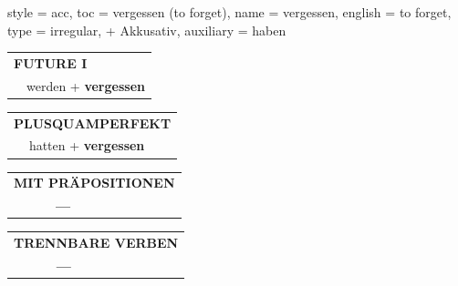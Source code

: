 \begin{verbentry}{
  style = {acc},
  toc = {vergessen (to forget)},
  name = {vergessen},
  english = {to forget},
  type = {irregular, + Akkusativ},
  auxiliary = {haben}
}
\begin{tabular}{rl}
    \multicolumn{2}{l}{\textbf{FUTURE I} }\\
  &  werden + \textbf{vergessen}\\
 
  \end{tabular}
\hfill
   \begin{tabular}{rl}
      \multicolumn{2}{l}{\textbf{PLUSQUAMPERFEKT}}\\
  &  hatten + \textbf{vergessen}\\
  \end{tabular}
  
  
\vspace{10pt}

\begin{tabular}{lll}
\multicolumn{3}{l}{\textbf{MIT PRÄPOSITIONEN}}\\
& \textbf{---} & \\
\end{tabular}
\hfill
\begin{tabular}{lll}
\multicolumn{3}{l}{\textbf{TRENNBARE VERBEN}}\\
& \textbf{---} & \\
\end{tabular}
\vspace{-5pt}
\end{verbentry}

